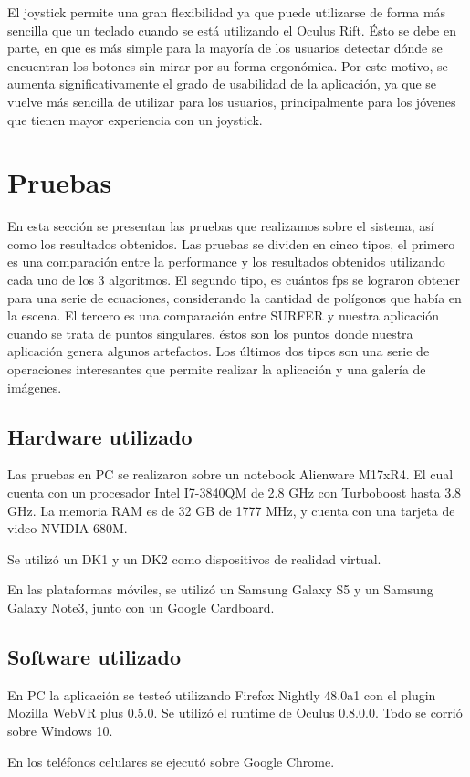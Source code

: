 \documentclass[12pt]{article}
\begin{document}
El joystick permite una gran flexibilidad ya que puede utilizarse de forma más sencilla que un teclado cuando se está utilizando el Oculus Rift. Ésto se debe en parte, en que es más simple para la mayoría de los usuarios detectar dónde se encuentran los botones sin mirar por su forma ergonómica. Por este motivo, se aumenta significativamente el grado de usabilidad de la aplicación, ya que se vuelve más sencilla de utilizar para los usuarios, principalmente para los jóvenes que tienen mayor experiencia con un joystick.
\clearpage
\section{Pruebas}
En esta sección se presentan las pruebas que realizamos sobre el sistema, así como los resultados obtenidos. Las pruebas se dividen en cinco tipos, el primero es una comparación entre la performance y los resultados obtenidos utilizando cada uno de los 3 algoritmos. El segundo tipo, es cuántos fps se lograron obtener para una serie de ecuaciones, considerando la cantidad de polígonos que había en la escena. El tercero es una comparación entre SURFER y nuestra aplicación cuando se trata de puntos singulares, éstos son los puntos donde nuestra aplicación genera algunos artefactos. Los últimos dos tipos son una serie de operaciones interesantes que permite realizar la aplicación y una galería de imágenes.
\subsection{Hardware utilizado}
Las pruebas en PC se realizaron sobre un notebook Alienware M17xR4. El cual cuenta con un procesador Intel I7-3840QM de 2.8 GHz con Turboboost hasta 3.8 GHz. La memoria RAM es de 32 GB de 1777 MHz, y cuenta con una tarjeta de video NVIDIA 680M.

Se utilizó un DK1 y un DK2 como dispositivos de realidad virtual.

En las plataformas móviles, se utilizó un Samsung  Galaxy S5 y un Samsung  Galaxy Note3, junto con un Google Cardboard. 

\subsection{Software utilizado}
En PC la aplicación se testeó utilizando Firefox Nightly 48.0a1 con el plugin Mozilla WebVR plus 0.5.0. Se utilizó el runtime de Oculus 0.8.0.0. Todo se corrió sobre Windows 10.

En los teléfonos celulares se ejecutó sobre Google Chrome.
\end{document}
